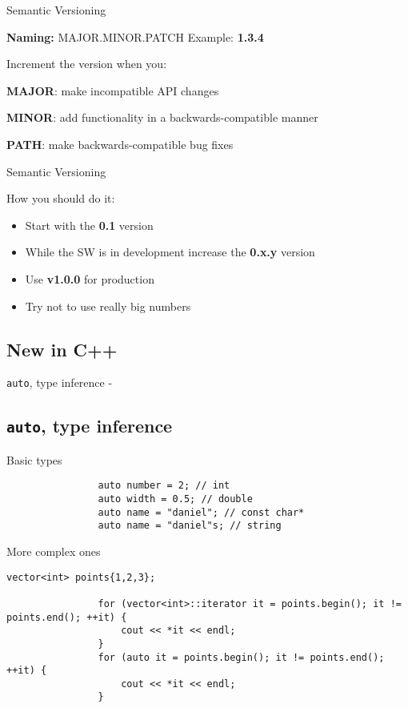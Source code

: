 \documentclass{beamer}
\newcommand{\normalSizeItem}[1] {
  \normalsize{\item #1}
}
\newcommand{\newFrameWithoutIndex}[1]{
	\begin{frame}
		#1
		\thispagestyle{empty}
	\end{frame}
}
\newcommand{\newSectionWithoutIndex}[1]{
	\newFrameWithoutIndex{\section{#1}}
}
\newcommand{\smallCite}[1]{
	\begin{small}
		\cite{#1}	
	\end{small}
}
\begin{document}
		\begin{frame}[fragile]{Semantic Versioning \smallCite{semanticVersioning}}	
			
			\textbf{Naming:} MAJOR.MINOR.PATCH
			\newline\newline
			Example: \textbf{1.3.4}
		
			Increment the version when you:
			\begin{itemize}
				\normalSizeItem { \textbf{MAJOR}: make incompatible API changes}
				\normalSizeItem { \textbf{MINOR}: add functionality in a backwards-compatible manner}
				\normalSizeItem { \textbf{PATH}: make backwards-compatible bug fixes}
			\end{itemize}
		\end{frame}
		
		\begin{frame}[fragile]{Semantic Versioning}	
			
			How you should do it:
			\begin{itemize}
				\item Start with the \textbf{0.1} version
				\item While the SW is in development increase the \textbf{0.x.y }version
				\item Use \textbf{v1.0.0} for production
				\item Try not to use really big numbers
			\end{itemize}
		\end{frame}
		
		\newSectionWithoutIndex{New in C++}	
		
		\begin{frame}[fragile]{\texttt{auto}, type inference -\smallCite{cppReference}}\subsection{\texttt{auto}, type inference}	
			\begin{itemize}
			
				\normalSizeItem{Basic types}
				\begin{lstlisting}
				auto number = 2; // int
				auto width = 0.5; // double
				auto name = "daniel"; // const char*
				auto name = "daniel"s; // string
				\end{lstlisting}
				
				\normalSizeItem{More complex ones}
				\begin{lstlisting}[basicstyle={\tiny\ttfamily}]
				vector<int> points{1,2,3};
				
				for (vector<int>::iterator it = points.begin(); it != points.end(); ++it) {
					cout << *it << endl;
				}
				for (auto it = points.begin(); it != points.end(); ++it) {
					cout << *it << endl;
				}
				\end{lstlisting}
				
			\end{itemize}
		\end{frame}
		
\end{document}
